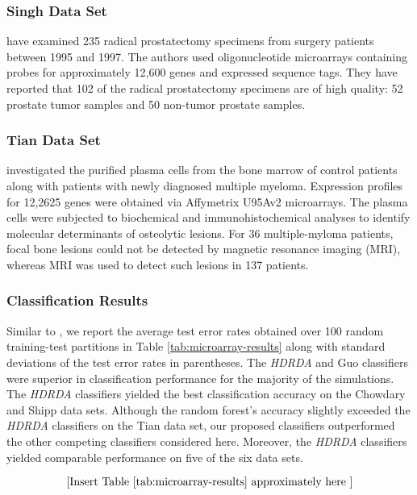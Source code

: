 \documentclass[]{interact}\usepackage[]{graphicx}\usepackage[]{color}
\begin{document}
\subsubsection{Singh Data Set}

\cite{Singh:2002fh} have examined 235 radical prostatectomy specimens from
surgery patients between 1995 and 1997. The authors used oligonucleotide
microarrays containing probes for approximately 12,600 genes and expressed
sequence tags. They have reported that 102 of the radical prostatectomy
specimens are of high quality: 52 prostate tumor samples and 50 non-tumor
prostate samples.

\subsubsection{Tian Data Set}

\cite{Tian:2003ht} investigated the purified plasma cells from the bone marrow
of control patients along with patients with newly diagnosed multiple
myeloma. Expression profiles for 12,2625 genes were obtained via Affymetrix
U95Av2 microarrays. The plasma cells were subjected to biochemical and
immunohistochemical analyses to identify molecular determinants of osteolytic
lesions. For 36 multiple-myloma patients, focal bone lesions could not be
detected by magnetic resonance imaging (MRI), whereas MRI was used to detect
such lesions in 137 patients.

\subsubsection{Classification Results}

Similar to \cite{Witten:2011kc}, we report the average test error rates obtained
over 100 random training-test partitions in Table \ref{tab:microarray-results}
along with standard deviations of the test error rates in parentheses. The
\emph{HDRDA} and Guo classifiers were superior in classification performance for
the majority of the simulations. The \emph{HDRDA} classifiers yielded the best
classification accuracy on the Chowdary and Shipp data sets. Although the random
forest's accuracy slightly exceeded the \emph{HDRDA} classifiers on the Tian
data set, our proposed classifiers outperformed the other competing classifiers
considered here. Moreover, the \emph{HDRDA} classifiers yielded comparable
performance on five of the six data sets.

\[ \left[\text{Insert Table \ref{tab:microarray-results} approximately here }\right] \]
\end{document}
